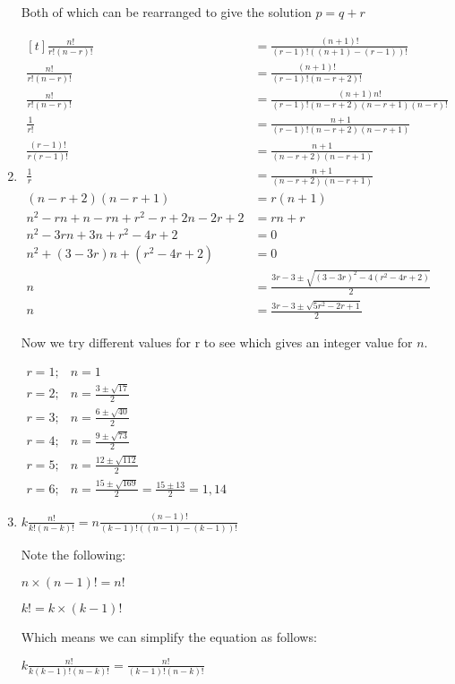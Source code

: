 \documentclass[../main.tex]{subfiles}
\begin{document}
\begin{enumerate}
    Both of which can be rearranged to give the solution \(p=q+r\)
    \item 
    $
    \!
    \begin{aligned}[t]
    \frac{n!}{r!(n-r)!}
    &=\frac{(n+1)!}{(r-1)!((n+1)-(r-1))!}\\
    \frac{n!}{r!(n-r)!}
    &=\frac{(n+1)!}{(r-1)!(n-r+2)!}\\
    \frac{n!}{r!(n-r)!}
    &=\frac{(n+1)n!}{(r-1)!(n-r+2)(n-r+1)(n-r)!}\\
    \frac{1}{r!}
    &=\frac{n+1}{(r-1)!(n-r+2)(n-r+1)}\\
    \frac{(r-1)!}{r(r-1)!}
    &=\frac{n+1}{(n-r+2)(n-r+1)}\\
    \frac{1}{r}
    &=\frac{n+1}{(n-r+2)(n-r+1)}\\
    (n-r+2)(n-r+1)
    &=r(n+1)\\
    n^2 - rn + n -rn+r^2-r+2n-2r+2
    &=rn+r\\
    n^2-3rn+3n+r^2-4r+2
    &=0\\
    n^2+(3-3r)n+(r^2-4r+2)
    &=0\\
    n
    &=\frac{3r-3 \pm \sqrt{(3-3r)^2-4(r^2-4r+2)}}{2}\\
    n
    &=\frac{3r-3 \pm \sqrt{5r^2-2r+1}}{2}
    \end{aligned}
    $

    Now we try different values for r to see which gives an integer value for \(n\).
    
    $
    \begin{aligned}
    r=1; &n=1\\
    r=2; &n=\frac{3 \pm \sqrt{17}}{2}\\
    r=3; &n=\frac{6 \pm \sqrt{40}}{2}\\
    r=4; &n=\frac{9 \pm \sqrt{73}}{2}\\
    r=5; &n=\frac{12 \pm \sqrt{112}}{2}\\
    r=6; &n=\frac{15 \pm \sqrt{169}}{2}=\frac{15\pm 13}{2}=1,14
    \end{aligned}
    $

    \item
    \(k\frac{n!}{k!(n-k)!}=n\frac{(n-1)!}{(k-1)!((n-1)-(k-1))!} \)

    Note the following:

    \(n \times (n-1)! = n!\)

    \(k! = k \times (k-1)! \)

    Which means we can simplify the equation as follows:

    \(k\frac{n!}{k(k-1)!(n-k)!}=\frac{n!}{(k-1)!(n-k)!} \)


\end{enumerate}
\end{document}
